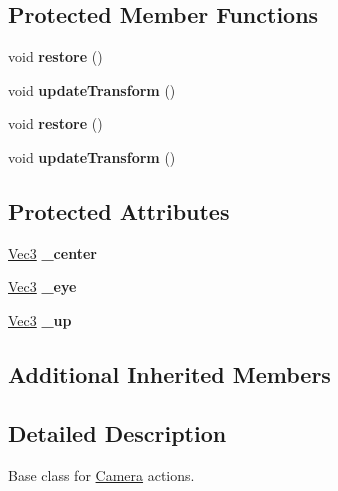 \subsection*{Protected Member Functions}
\begin{DoxyCompactItemize}
\item 
\mbox{\label{classActionCamera_aeb1dfe7863203e738dbbc499dc2e9c5e}} 
void {\bfseries restore} ()
\item 
\mbox{\label{classActionCamera_a3dd4ef378b92db6da7ded8baa640649b}} 
void {\bfseries update\+Transform} ()
\item 
\mbox{\label{classActionCamera_aeb1dfe7863203e738dbbc499dc2e9c5e}} 
void {\bfseries restore} ()
\item 
\mbox{\label{classActionCamera_a3dd4ef378b92db6da7ded8baa640649b}} 
void {\bfseries update\+Transform} ()
\end{DoxyCompactItemize}
\subsection*{Protected Attributes}
\begin{DoxyCompactItemize}
\item 
\mbox{\label{classActionCamera_a6c07c75fe8d613485e1eb9fd55fb0efa}} 
\hyperlink{classVec3}{Vec3} {\bfseries \+\_\+center}
\item 
\mbox{\label{classActionCamera_af736448cdc992aabfafbe931755d8d70}} 
\hyperlink{classVec3}{Vec3} {\bfseries \+\_\+eye}
\item 
\mbox{\label{classActionCamera_a9caaf0d4bb2754f0eac71213101c635f}} 
\hyperlink{classVec3}{Vec3} {\bfseries \+\_\+up}
\end{DoxyCompactItemize}
\subsection*{Additional Inherited Members}


\subsection{Detailed Description}
Base class for \hyperlink{classCamera}{Camera} actions. 

